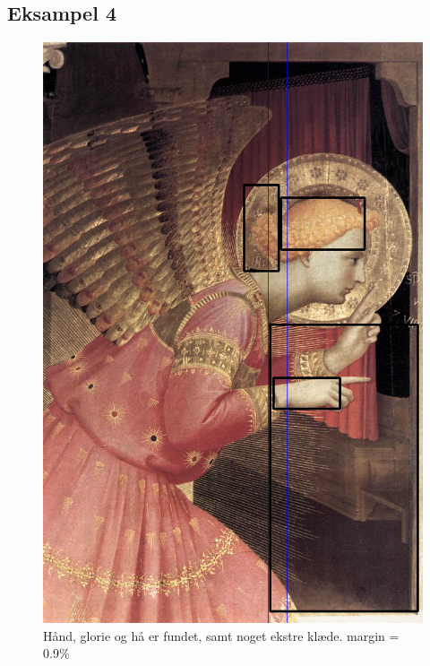 \subsection{Eksampel 4}
\begin{figure}[h!!]
	\begin{center}
		\includegraphics[scale=0.30,angle=0]{afsnit/afprovning/billeder/BB1annunc2.png}
	\end{center}
	\caption[]{Hånd, glorie og hå er fundet, samt noget ekstre klæde.
	margin = 0.9\%}
	\label{BB1annunc2}
\end{figure}

